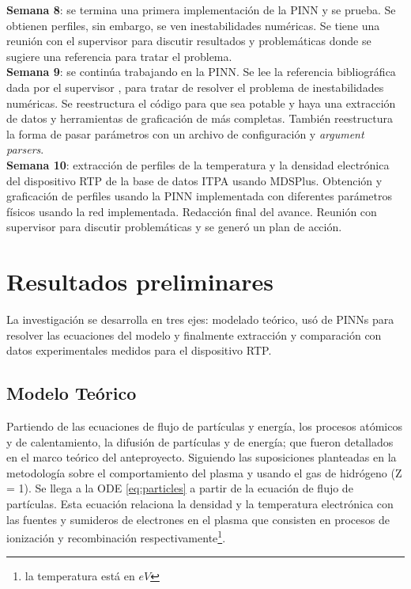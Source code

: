 \textbf{Semana 8}: se termina una primera implementación de la PINN y se prueba. Se obtienen perfiles, sin embargo, se ven inestabilidades numéricas. Se tiene una reunión con el supervisor para discutir resultados y problemáticas donde se sugiere una referencia para tratar el problema.\\

\textbf{Semana 9}: se continúa trabajando en la PINN. Se lee la referencia bibliográfica dada por el supervisor \cite{chen2026}, para tratar de resolver el problema de inestabilidades numéricas. Se reestructura el código para que sea potable y haya una extracción de datos y herramientas de graficación de más completas. También reestructura la forma de pasar parámetros con un archivo de configuración y \textit{argument parsers}.\\

\textbf{Semana 10}: extracción de perfiles de la temperatura y la densidad electrónica del dispositivo RTP de la base de datos ITPA usando MDSPlus. Obtención y graficación de perfiles usando la PINN implementada con diferentes parámetros físicos usando la red implementada. Redacción final del avance. Reunión con supervisor para discutir problemáticas y se generó un plan de acción.   \\


\section{Resultados preliminares}

La investigación se desarrolla en tres ejes: modelado teórico, usó de PINNs para resolver las ecuaciones del modelo y finalmente extracción y comparación con datos experimentales medidos para el dispositivo RTP. 

\subsection{Modelo Teórico}

Partiendo de las ecuaciones de flujo de partículas y energía, los procesos atómicos y de calentamiento, la difusión de partículas y de energía; que fueron detallados en el marco teórico del anteproyecto. Siguiendo las suposiciones planteadas en la metodología sobre el comportamiento del plasma y usando el gas de hidrógeno (Z = 1).  Se llega a la ODE \eqref{eq:particles} a partir de la ecuación de flujo de partículas. Esta ecuación relaciona la densidad y la temperatura electrónica con las fuentes y sumideros de electrones en el plasma que consisten en procesos de ionización y recombinación respectivamente\footnote{la temperatura está en $eV$}.

